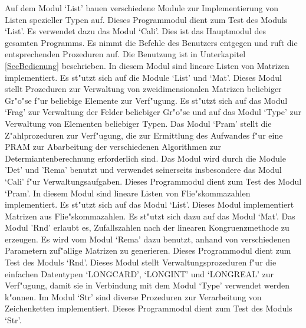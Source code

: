 \begin{MyDescription}
    Auf dem Modul `List' bauen verschiedene Module zur Implementierung von
    Listen spezieller Typen auf.
    Dieses Programmodul dient zum Test des Moduls `List'. Es verwendet
    dazu das Modul `Cali'.
    Dies ist das Hauptmodul des gesamten Programms. Es nimmt die Befehle
    des Benutzers entgegen und ruft die entsprechenden Prozeduren auf.
    Die Benutzung ist in Unterkapitel \ref{SecBedienung} beschrieben.
    In diesem Modul sind lineare Listen von Matrizen
    implementiert. Es st"utzt sich auf die Module `List' und `Mat'.
    Dieses Modul stellt Prozeduren zur Verwaltung von zweidimensionalen 
    Matrizen beliebiger Gr"o"se f"ur beliebige Elemente zur Verf"ugung.
    Es st"utzt sich auf das Modul `Frag' zur Verwaltung der Felder
    beliebiger Gr"o"se und auf das Modul `Type' zur Verwaltung von 
    Elementen beliebiger Typen.
    Das Modul `Pram' stellt die Z"ahlprozeduren zur Verf"ugung, die zur 
    Ermittlung des Aufwandes f"ur
    eine PRAM zur Abarbeitung der verschiedenen Algorithmen zur 
    Determiantenberechnung erforderlich sind. Das Modul wird durch die
    Module 'Det' und 'Rema' benutzt und verwendet seinerseits insbesondere
    das Modul `Cali' f"ur Verwaltungsaufgaben.
    Dieses Programmodul dient zum Test des Modul `Pram'.
    In diesem Modul sind lineare Listen von Flie"skommazahlen
    implementiert. Es st"utzt sich auf das Modul `List'.
    Dieses Modul implementiert Matrizen aus Flie"skommazahlen. Es st"utzt
    sich dazu auf das Modul \nopagebreak[3] `Mat'.
    Das Modul 'Rnd' erlaubt es, Zufallszahlen nach der linearen 
    Kongruenzmethode zu erzeugen. Es wird vom Modul `Rema' dazu benutzt,
    anhand von verschiedenen Parametern zuf"allige Matrizen zu generieren.
    Dieses Programmodul dient zum Test des Moduls `Rnd'.
 \sloppy
    Dieses Modul stellt Verwaltungsprozeduren f"ur die einfachen 
    Datentypen \newline[3] `LONGCARD', `LONGINT' und `LONGREAL' zur 
    Verf"ugung, damit
    sie in Verbindung mit dem Modul `Type' verwendet werden k"onnen.
    \fussy
{}
    Im Modul `Str' sind diverse Prozeduren zur Verarbeitung von 
    Zeichenketten implementiert.
    Dieses Programmodul dient zum Test des Moduls `Str'.

\end{MyDescription}
